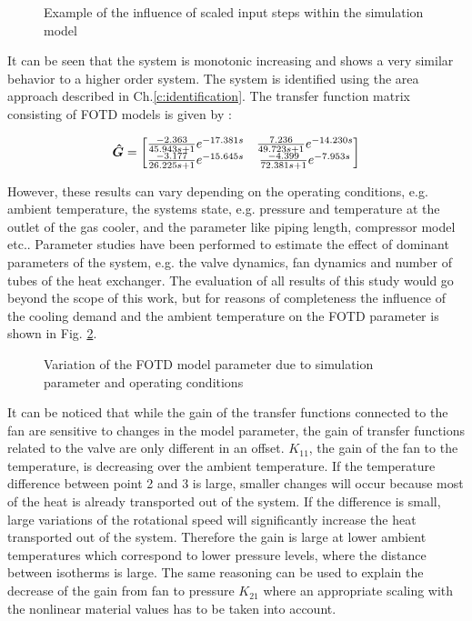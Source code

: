 \begin{figure}[H]

\caption{Example of the influence of scaled input steps within the simulation model}
\label{c:physical:f:identification_example}
\end{figure}

It can be seen that the system is monotonic increasing and shows a very similar behavior to a higher order system. The system is identified using the area approach described in Ch.\ref{c:identification}. The transfer function matrix consisting of FOTD models is given by :

\begin{align*}
\mbox{\boldmath$\hat{G}$} = \begin{bmatrix}
\frac{-2.363}{45.943s+1}e^{-17.381s} & 
\frac{7.236}{49.723s+1}e^{-14.230s} \\
\frac{-3.177}{26.225s+1}e^{-15.645s} &
\frac{-4.399}{72.381s+1}e^{-7.953s}
\end{bmatrix}
\end{align*}

However, these results can vary depending on the operating conditions, e.g. ambient temperature, the systems state, e.g. pressure and temperature at the outlet of the gas cooler, and the parameter like piping length, compressor model etc.. Parameter studies have been performed to estimate the effect of dominant parameters of the system, e.g. the valve dynamics, fan dynamics and number of tubes of the heat exchanger. The evaluation of all results of this study would go beyond the scope of this work, but for reasons of completeness the influence of the cooling demand and the ambient temperature on the FOTD parameter is shown in Fig. \ref{c:physical:f:parameter_variation}.

\begin{figure}[H]

\caption{Variation of the FOTD model parameter due to simulation parameter and operating conditions}
\label{c:physical:f:parameter_variation}
\end{figure}

It can be noticed that while the gain of the transfer functions connected to the fan are sensitive to changes in the model parameter, the gain of transfer functions related to the valve are only different in an offset. $K_{11}$, the gain of the fan to the temperature, is decreasing over the ambient temperature. If the temperature difference between point 2 and 3 is large, smaller changes will occur because most of the heat is already transported out of the system. If the difference is small, large variations of the rotational speed will significantly increase the heat transported out of the system. Therefore the gain is large at lower ambient temperatures which correspond to lower pressure levels, where the distance between isotherms is large. The same reasoning can be used to explain the decrease of the gain from fan to pressure $K_{21}$ where an appropriate scaling with the nonlinear material values has to be taken into account.\\

